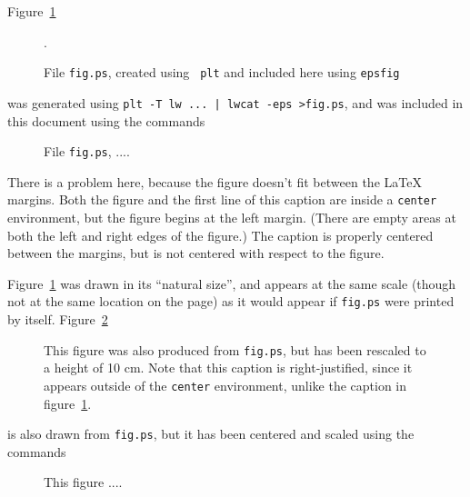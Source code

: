 \documentclass{book}
\begin{document}
%
Figure~\ref{fig:a1}
\begin{figure}
\begin{center}
\caption[An EPS plot in ``natural size'']{File {\tt fig.ps}, created using {\tt
plt} and included here
\label{fig:a1} using {\tt epsfig}}.
\end{center}
\end{figure}
was generated using {\tt plt -T lw ... | lwcat -eps >fig.ps}, and was
included in this document using the commands
\begin{center}
\begin{boxedverbatim}
\begin{figure}
\begin{center}
\caption{File {\tt fig.ps}, ....}
\end{center}
\end{figure}
\end{boxedverbatim}
\end{center}

There is a problem here, because the figure doesn't fit between the
\LaTeX{} margins.  Both the figure and the first line of this caption
are inside a {\tt center} environment, but the figure begins at the
left margin. (There are empty areas at both the left and right edges of
the figure.)  The caption is properly centered between the margins,
but is not centered with respect to the figure.

Figure~\ref{fig:a1} was drawn in its ``natural size'', and appears at
the same scale (though not at the same location on the page) as it
would appear if {\tt fig.ps} were printed by itself.  Figure~\ref{fig:a2}
\begin{figure}[h]
\begin{center}
\end{center}
\caption[A rescaled EPS plot]{This figure was also produced from {\tt fig.ps},
but has been \label{fig:a2} rescaled to a height of 10 cm.  Note that this
caption is right-justified, since it appears outside of the {\tt center}
environment, unlike the caption in figure~\ref{fig:a1}.}
\end{figure}
is also drawn from {\tt fig.ps}, but it has been centered and scaled using
the commands
\begin{center}
\begin{boxedverbatim}
\begin{figure}[h]
\begin{center}
\end{center}
\caption{This figure ....}
\end{figure}
\end{boxedverbatim}
\end{center}
\end{document}
